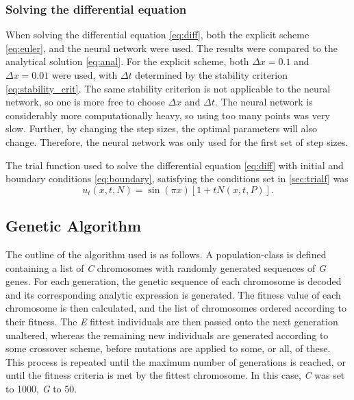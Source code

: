 \documentclass[multicolumn, 9pt]{extarticle}
\begin{document}
\subsubsection{Solving the differential equation}
When solving the differential equation \eqref{eq:diff}, both the explicit scheme \eqref{eq:euler}, and the neural network were used. The results were compared to the analytical solution \eqref{eq:anal}. For the explicit scheme, both $\Delta x=0.1$ and $\Delta x=0.01$ were used, with $\Delta t$ determined by the stability criterion \eqref{eq:stability_crit}. The same stability criterion is not applicable to the neural network, so one is more free to choose $\Delta x$ and $\Delta t$. The neural network is considerably more computationally heavy, so using too many points was very slow. Further, by changing the step sizes, the optimal parameters will also change. Therefore, the neural network was only used for the first set of step sizes.

The trial function used to solve the differential equation \eqref{eq:diff} with initial and boundary conditions \eqref{eq:boundary}, satisfying the conditions set in \ref{sec:trialf} was
\begin{equation}
	u_t(x, t, N) = \sin{(\pi x)}[1 + tN(x, t, P)].
\end{equation}


\subsection{Genetic Algorithm}
The outline of the algorithm used is as follows. A population-class is defined containing a list of \textit{C} chromosomes with randomly generated sequences of \textit{G} genes. For each generation, the genetic sequence of each chromosome is decoded and its corresponding analytic expression is generated. The fitness value of each chromosome is then calculated, and the list of chromosomes ordered according to their fitness.
The \textit{E} fittest individuals are then passed onto the next generation unaltered, whereas the remaining new individuals are generated according to some crossover scheme, before mutations are applied to some, or all, of these.  This process is repeated until the maximum number of generations is reached, or until the fitness criteria is met by the fittest chromosome. In this case, \textit{C} was set to 1000, \textit{G} to 50.
\end{document}
